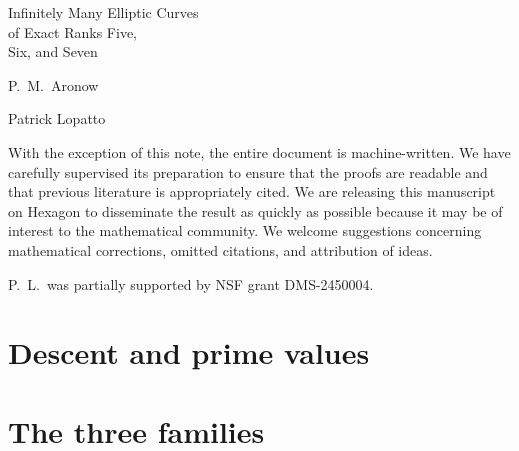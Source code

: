 \documentclass[12pt,oneside,openany]{book}
\numberwithin{equation}{chapter}
\theoremstyle{plain}
\theoremstyle{definition}
\theoremstyle{remark}
\newcommand{\npptitlepage}[2]{%
  \hypersetup{pageanchor=false}%
  \begin{titlepage}
  \centering\normalfont
  \vspace*{1.7in}
  {\large\strut\par}
  \vspace{1.05in}
  {\fontsize{28}{35}\selectfont #1\par}
  \vspace{1.1in}
  {\Large\def\\{\par\vspace{10pt}}#2\par}
  \vfill
  \end{titlepage}%
  \hypersetup{pageanchor=true}}
\begin{document}
\frontmatter
\npptitlepage{Infinitely Many Elliptic Curves\\ of Exact Ranks Five,\\ Six, and Seven}{P.\ M.\ Aronow\\ Patrick Lopatto}
\begin{authorsnote}
With the exception of this note, the entire
document is machine-written. We have carefully supervised its preparation
to ensure that the proofs are readable and that
previous literature is appropriately cited. We are
releasing this manuscript on Hexagon to disseminate the result as quickly as
possible because it may be of interest to the mathematical
community. 
We welcome suggestions concerning mathematical corrections, omitted citations, and attribution of ideas.

P.\ L.\ was partially supported by NSF grant DMS-2450004.
\end{authorsnote}
\begin{abstractpage}

\end{abstractpage}
\tableofcontents
\mainmatter




\part{Descent and prime values}\label{part:tools}




\part{The three families}\label{part:families}





\appendix
{}



\backmatter

\setlength{\bibsep}{3pt plus 1pt minus 1pt}


\end{document}
